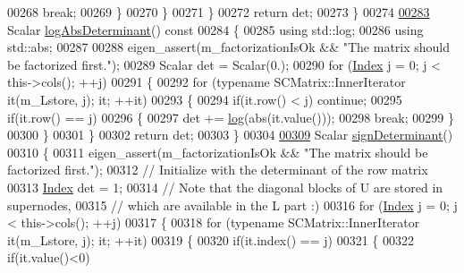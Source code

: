 \begin{DoxyCode}
00268             \textcolor{keywordflow}{break};
00269           \}
00270         \}
00271       \}
00272       \textcolor{keywordflow}{return} det;
00273     \}
00274 
\hyperlink{group___sparse_l_u___module_a89e30a7df205596784a5a73f4768eaec}{00283}     Scalar \hyperlink{group___sparse_l_u___module_a89e30a7df205596784a5a73f4768eaec}{logAbsDeterminant}()\textcolor{keyword}{ const}
00284 \textcolor{keyword}{    }\{
00285       \textcolor{keyword}{using} std::log;
00286       \textcolor{keyword}{using} std::abs;
00287 
00288       eigen\_assert(m\_factorizationIsOk && \textcolor{stringliteral}{"The matrix should be factorized first."});
00289       Scalar det = Scalar(0.);
00290       \textcolor{keywordflow}{for} (\hyperlink{namespace_eigen_a62e77e0933482dafde8fe197d9a2cfde}{Index} j = 0; j < this->cols(); ++j)
00291       \{
00292         \textcolor{keywordflow}{for} (\textcolor{keyword}{typename} SCMatrix::InnerIterator it(m\_Lstore, j); it; ++it)
00293         \{
00294           \textcolor{keywordflow}{if}(it.row() < j) \textcolor{keywordflow}{continue};
00295           \textcolor{keywordflow}{if}(it.row() == j)
00296           \{
00297             det += \hyperlink{structlog}{log}(abs(it.value()));
00298             \textcolor{keywordflow}{break};
00299           \}
00300         \}
00301       \}
00302       \textcolor{keywordflow}{return} det;
00303     \}
00304 
\hyperlink{group___sparse_l_u___module_a6651143e3b18fa90cfb3808b6fd23c4e}{00309}     Scalar \hyperlink{group___sparse_l_u___module_a6651143e3b18fa90cfb3808b6fd23c4e}{signDeterminant}()
00310     \{
00311       eigen\_assert(m\_factorizationIsOk && \textcolor{stringliteral}{"The matrix should be factorized first."});
00312       \textcolor{comment}{// Initialize with the determinant of the row matrix}
00313       \hyperlink{namespace_eigen_a62e77e0933482dafde8fe197d9a2cfde}{Index} det = 1;
00314       \textcolor{comment}{// Note that the diagonal blocks of U are stored in supernodes,}
00315       \textcolor{comment}{// which are available in the  L part :)}
00316       \textcolor{keywordflow}{for} (\hyperlink{namespace_eigen_a62e77e0933482dafde8fe197d9a2cfde}{Index} j = 0; j < this->cols(); ++j)
00317       \{
00318         \textcolor{keywordflow}{for} (\textcolor{keyword}{typename} SCMatrix::InnerIterator it(m\_Lstore, j); it; ++it)
00319         \{
00320           \textcolor{keywordflow}{if}(it.index() == j)
00321           \{
00322             \textcolor{keywordflow}{if}(it.value()<0)

\end{DoxyCode}
